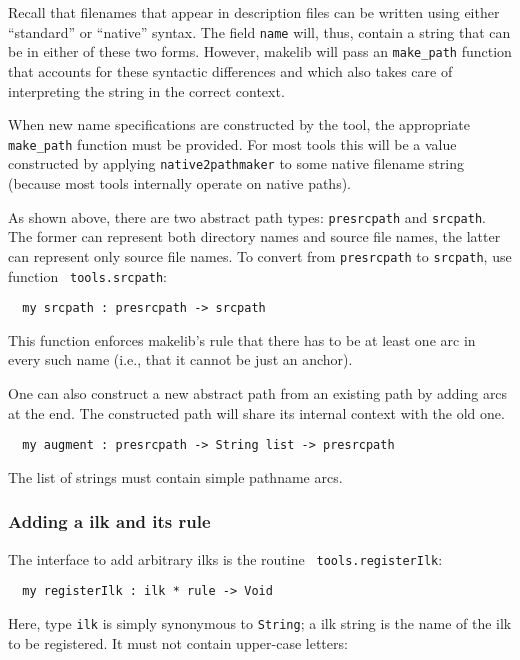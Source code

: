 Recall that filenames that appear in description files can be written
using either ``standard'' or ``native'' syntax.  The field {\tt name}
will, thus, contain a string that can be in either of these two forms.
However, makelib will pass an {\tt make_path} function that accounts for these
syntactic differences and which also takes care of interpreting the
string in the correct context.

When new name specifications are constructed by the tool, the
appropriate {\tt make_path} function must be provided.  For most tools
this will be a value constructed by applying {\tt native2pathmaker} to
some native filename string (because most tools internally operate on
native paths).

As shown above, there are two abstract path types: {\tt presrcpath}
and {\tt srcpath}.  The former can represent both directory names and
source file names, the latter can represent only source file names.
To convert from {\tt presrcpath} to {\tt srcpath}, use function {\tt
tools.srcpath}:
\begin{verbatim}
  my srcpath : presrcpath -> srcpath
\end{verbatim}
This function enforces makelib's rule that there has to be at least one arc
in every such name (i.e., that it cannot be just an anchor).

One can also construct a new abstract path from an existing path by
adding arcs at the end.  The constructed path will share its internal
context with the old one.

\begin{verbatim}
  my augment : presrcpath -> String list -> presrcpath
\end{verbatim}

The list of strings must contain simple pathname arcs.

\subsubsection{Adding a ilk and its rule}

The interface to add arbitrary ilks is the routine {\tt
tools.registerIlk}:

\begin{verbatim}
  my registerIlk : ilk * rule -> Void
\end{verbatim}

Here, type {\tt ilk} is simply synonymous to {\tt String}; a ilk
string is the name of the ilk to be registered.  It must not contain
upper-case letters:

